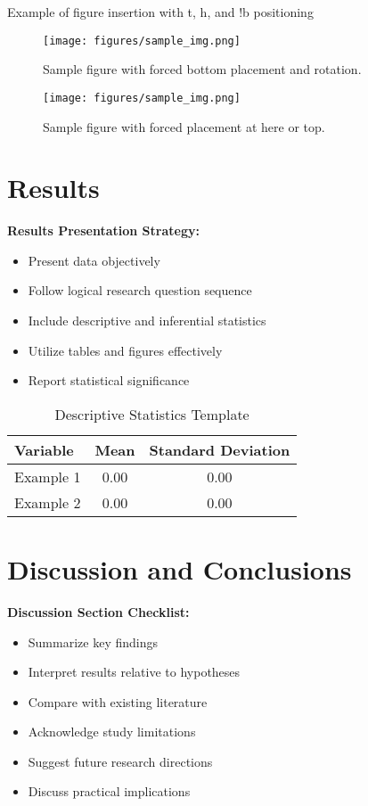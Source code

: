 \documentclass[stu,12pt,floatsintext]{apa7}
\begin{document}
Example of figure insertion with t, h, and !b positioning 

\begin{figure}[!b]
    \centering
    \texttt{[image: figures/sample\_img.png]}
    \caption{Sample figure with forced bottom placement and rotation.}
    \label{fig:sample_figre}
\end{figure}


\begin{figure}[!ht]
    \centering
    \texttt{[image: figures/sample\_img.png]}
    \caption{Sample figure with forced placement at here or top.}
    \label{fig:sample_figure}
\end{figure}

\section{Results}
\textbf{Results Presentation Strategy:}
\begin{itemize}
    \item Present data objectively
    \item Follow logical research question sequence
    \item Include descriptive and inferential statistics
    \item Utilize tables and figures effectively
    \item Report statistical significance
\end{itemize}

\begin{table}[ht]
    \caption{Descriptive Statistics Template}
    \centering
    \begin{tabular}{lcc}
        \hline
        Variable & Mean & Standard Deviation \\
        \hline
        Example 1 & 0.00 & 0.00 \\
        Example 2 & 0.00 & 0.00 \\
        \hline
    \end{tabular}
\end{table}

\section{Discussion and Conclusions}
\textbf{Discussion Section Checklist:}
\begin{itemize}
    \item Summarize key findings
    \item Interpret results relative to hypotheses
    \item Compare with existing literature
    \item Acknowledge study limitations
    \item Suggest future research directions
    \item Discuss practical implications
\end{itemize}
\end{document}
